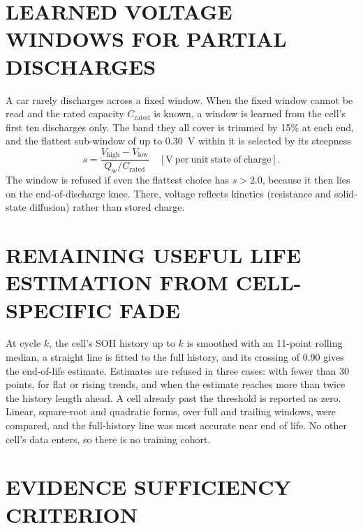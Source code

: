 \documentclass[12pt,a4paper]{amritareport}
\newcommand{\Qw}{Q_{\mathrm{w}}}
\begin{document}
\section{LEARNED VOLTAGE WINDOWS FOR PARTIAL DISCHARGES}
\label{sec:learned}

A car rarely discharges across a fixed window. When the fixed window cannot be read and the rated capacity $C_\mathrm{rated}$ is known, a window is learned from the cell's first ten discharges only. The band they all cover is trimmed by 15\% at each end, and the flattest sub-window of up to 0.30~V within it is selected by its steepness
\begin{equation}
s = \frac{V_\mathrm{high}-V_\mathrm{low}}{\Qw/C_\mathrm{rated}}
\quad [\mathrm{V\ per\ unit\ state\ of\ charge}] .
\label{eq:steep}
\end{equation}
The window is refused if even the flattest choice has $s > 2.0$, because it then lies on the end-of-discharge knee. There, voltage reflects kinetics (resistance and solid-state diffusion) rather than stored charge.

\section{REMAINING USEFUL LIFE ESTIMATION FROM CELL-SPECIFIC FADE}
\label{sec:rul-method}

At cycle $k$, the cell's SOH history up to $k$ is smoothed with an 11-point rolling median, a straight line is fitted to the full history, and its crossing of 0.90 gives the end-of-life estimate. Estimates are refused in three cases: with fewer than 30 points, for flat or rising trends, and when the estimate reaches more than twice the history length ahead. A cell already past the threshold is reported as zero. Linear, square-root and quadratic forms, over full and trailing windows, were compared, and the full-history line was most accurate near end of life. No other cell's data enters, so there is no training cohort.

\section{EVIDENCE SUFFICIENCY CRITERION}
\label{sec:suff-method}
\end{document}
